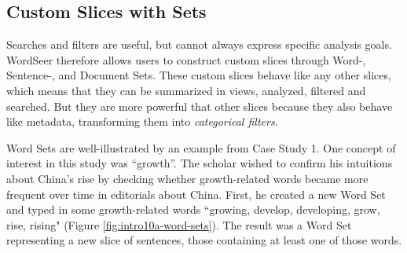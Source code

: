 \documentclass{sig-alternate}
\begin{document}
\subsection{Custom Slices with Sets}

Searches and filters are useful, but cannot always express  specific analysis goals. WordSeer therefore allows users to construct custom slices through Word-, Sentence-, and Document Sets. These custom slices behave like any other slices, which means that they can be summarized in views,  analyzed, filtered and searched. But they are more powerful that other slices because they also behave like metadata, transforming them into \emph{categorical filters}.

Word Sets are well-illustrated by an example from Case Study 1.  One concept of interest in this study was ``growth''. The scholar wished to confirm his intuitions about China's rise by checking whether  growth-related words became more frequent over time in editorials about China. First, he created a new Word Set and typed in some growth-related words ``growing, develop, developing, grow, rise, rising" (Figure \ref{fig:intro10a-word-sets}). The result was a Word Set representing a new slice of sentences, those containing at least one of those words. 
\end{document}
